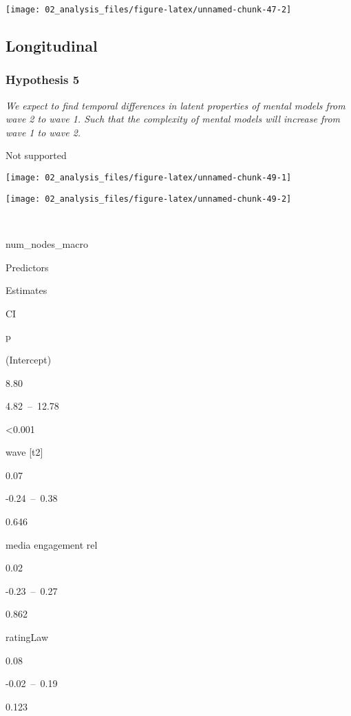 \documentclass[
]{article}
\begin{document}
\begin{center}\texttt{[image: 02\_analysis\_files/figure-latex/unnamed-chunk-47-2]} \end{center}

\hypertarget{longitudinal}{%
\subsection{Longitudinal}\label{longitudinal}}

\hypertarget{hypothesis-5}{%
\subsubsection{Hypothesis 5}\label{hypothesis-5}}

\emph{We expect to find temporal differences in latent properties of
mental models from wave 2 to wave 1. Such that the complexity of mental
models will increase from wave 1 to wave 2. }

Not supported

\begin{center}\texttt{[image: 02\_analysis\_files/figure-latex/unnamed-chunk-49-1]} \end{center}

\begin{center}\texttt{[image: 02\_analysis\_files/figure-latex/unnamed-chunk-49-2]} \end{center}

~

num\_nodes\_macro

Predictors

Estimates

CI

p

(Intercept)

8.80

4.82~--~12.78

\textless0.001

wave {[}t2{]}

0.07

-0.24~--~0.38

0.646

media engagement rel

0.02

-0.23~--~0.27

0.862

ratingLaw

0.08

-0.02~--~0.19

0.123
\end{document}
